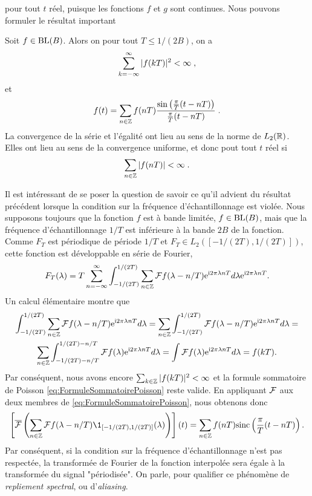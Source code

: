 pour tout $t$ r{\'e}el, puisque les fonctions $f$ et $g$ sont continues. Nous pouvons formuler le r{\'e}sultat important
\begin{theorem}
Soit $f \in \mathrm{BL}(B)$. Alors on pour tout $T \leq 1/(2B)$, on a
$$
\sum_{k= - \infty}^\infty |f(kT)|^2 < \infty \;,
$$
et
$$
f(t) = \sum_{n \in \mathbb{Z}} f(nT) \frac{\sin\left( \frac{\pi}{T}(t - nT)\right)}{\frac{\pi}{T}(t-nT)} \;.
$$
La convergence de la s{\'e}rie et l'{\'e}galit{\'e} ont lieu au sens de la norme de $L_2(\mathbb{R})$. Elles ont lieu au sens de la convergence
uniforme, et donc pout tout $t$ r{\'e}el si
$$
\sum_{n \in \mathbb{Z}} |f(nT)| < \infty \;.
$$
\end{theorem}
Il est int{\'e}ressant de se poser la question de savoir ce qu'il advient du r{\'e}sultat pr{\'e}c{\'e}dent
lorsque la condition sur la fr{\'e}quence d'{\'e}chantillonnage est viol{\'e}e.
Nous supposons toujours que la fonction $f$ est {\`a} bande limit{\'e}e, $f \in \mathrm{BL}(B)$, mais  que la fr{\'e}quence d'{\'e}chantillonnage $1/T $ est inf{\'e}rieure
{\`a} la bande $ 2 B$ de la fonction. Comme $F_T$ est p{\'e}riodique de p{\'e}riode $1/T$ et
$F_T \in L_2([-1/(2T),1/(2T)])$, cette fonction est d{\'e}veloppable en s{\'e}rie de Fourier,
$$
F_T(\lambda)= T \sum_{n=-\infty}^{\infty} \int_{-1/(2T)}^{1/(2T)} \sum_{n \in \mathbb{Z}} \mathcal{F} f(\lambda - n/T) \mathrm{e}^{\mathrm{i} 2 \pi \lambda n T} d \lambda \mathrm{e}^{\mathrm{i} 2 \pi \lambda n T}.
$$
Un calcul {\'e}l{\'e}mentaire montre que
\begin{multline*}
\int_{-1/(2T)}^{1/(2T)} \sum_{n \in \mathbb{Z}} \mathcal{F} f(\lambda - n/T) \mathrm{e}^{\mathrm{i} 2 \pi \lambda n T} d \lambda = \sum_{n \in \mathbb{Z}} \int_{-1/(2T)}^{1/(2T)}  \mathcal{F} f(\lambda - n/T) \mathrm{e}^{\mathrm{i} 2 \pi \lambda n T} d \lambda = \\
\sum_{n \in \mathbb{Z}} \int_{-1/(2T)-n/T}^{1/(2T)-n/T}  \mathcal{F} f(\lambda) \mathrm{e}^{\mathrm{i} 2 \pi \lambda n T} d \lambda = \int \mathcal{F} f(\lambda) \mathrm{e}^{\mathrm{i} 2 \pi \lambda n T} d \lambda = f(kT).
\end{multline*}
Par cons{\'e}quent, nous avons encore $\sum_{k \in \mathbb{Z}} |f(kT)|^2 < \infty$ et la formule sommatoire de Poisson \eqref{eq:FormuleSommatoirePoisson} reste valide.
En appliquant $\mathcal{F}$ aux deux membres de \eqref{eq:FormuleSommatoirePoisson}, nous obtenons donc
$$
\left[\TFAC{\sum_{n \in \zset} \TF f(\lambda - n /T) \1_{[-1/(2T),1/(2T)]}(\lambda)}\right](t)
= \sum_{n \in \zset} f(nT) \mathrm{sinc} \left( \frac{\pi}{T}(t-nT) \right).
$$
Par cons{\'e}quent, si la condition sur la fr{\'e}quence d'{\'e}chantillonnage n'est pas respect{\'e}e, la transform{\'e}e de Fourier de la fonction interpol{\'e}e sera {\'e}gale
{\`a} la transform{\'e}e du signal "p{\'e}riodis{\'e}e". On parle, pour qualifier ce ph{\'e}nom{\`e}ne de  \emph{repliement spectral}, ou d'\emph{aliasing}.


